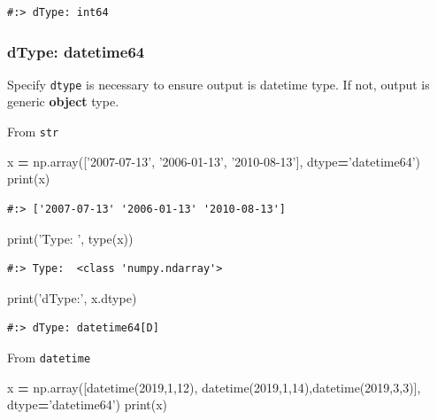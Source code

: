 \documentclass[
]{book}
\newenvironment{Shaded}{\begin{snugshade}}{\end{snugshade}}
\newcommand{\BuiltInTok}[1]{#1}
\newcommand{\DecValTok}[1]{\textcolor[rgb]{0.06,0.06,0.06}{#1}}
\newcommand{\NormalTok}[1]{#1}
\newcommand{\OperatorTok}[1]{\textcolor[rgb]{0.43,0.43,0.43}{\textbf{#1}}}
\newcommand{\StringTok}[1]{\textcolor[rgb]{0.5,0.5,0.5}{#1}}
\begin{document}
\begin{verbatim}
#:> dType: int64
\end{verbatim}

\hypertarget{dtype-datetime64}{%
\subsubsection{dType: datetime64}\label{dtype-datetime64}}

Specify \texttt{dtype} is necessary to ensure output is datetime type. If not, output is generic \textbf{object} type.

From \texttt{str}

\begin{Shaded}
\begin{Highlighting}[]
\NormalTok{x }\OperatorTok{=}\NormalTok{ np.array([}\StringTok{'2007-07-13'}\NormalTok{, }\StringTok{'2006-01-13'}\NormalTok{, }\StringTok{'2010-08-13'}\NormalTok{], dtype}\OperatorTok{=}\StringTok{'datetime64'}\NormalTok{)}
\BuiltInTok{print}\NormalTok{(x)}
\end{Highlighting}
\end{Shaded}

\begin{verbatim}
#:> ['2007-07-13' '2006-01-13' '2010-08-13']
\end{verbatim}

\begin{Shaded}
\begin{Highlighting}[]
\BuiltInTok{print}\NormalTok{(}\StringTok{'Type: '}\NormalTok{, }\BuiltInTok{type}\NormalTok{(x))}
\end{Highlighting}
\end{Shaded}

\begin{verbatim}
#:> Type:  <class 'numpy.ndarray'>
\end{verbatim}

\begin{Shaded}
\begin{Highlighting}[]
\BuiltInTok{print}\NormalTok{(}\StringTok{'dType:'}\NormalTok{, x.dtype)}
\end{Highlighting}
\end{Shaded}

\begin{verbatim}
#:> dType: datetime64[D]
\end{verbatim}

From \texttt{datetime}

\begin{Shaded}
\begin{Highlighting}[]
\NormalTok{x }\OperatorTok{=}\NormalTok{ np.array([datetime(}\DecValTok{2019}\NormalTok{,}\DecValTok{1}\NormalTok{,}\DecValTok{12}\NormalTok{), datetime(}\DecValTok{2019}\NormalTok{,}\DecValTok{1}\NormalTok{,}\DecValTok{14}\NormalTok{),datetime(}\DecValTok{2019}\NormalTok{,}\DecValTok{3}\NormalTok{,}\DecValTok{3}\NormalTok{)], dtype}\OperatorTok{=}\StringTok{'datetime64'}\NormalTok{)}
\BuiltInTok{print}\NormalTok{(x)}
\end{Highlighting}
\end{Shaded}
\end{document}
